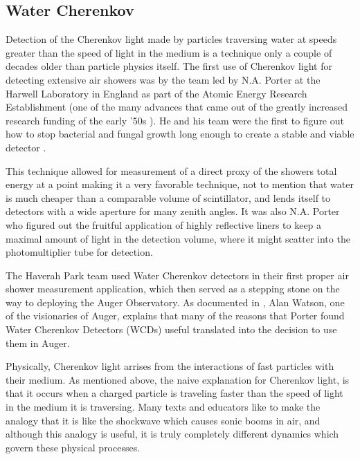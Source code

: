 \subsection{Water Cherenkov}
\label{wcd}
Detection of the Cherenkov light made by particles traversing water at speeds greater than the speed of light in the medium is a technique only a couple of decades older than particle physics itself. The first use of Cherenkov light for detecting extensive air showers was by the team led by N.A. Porter at the Harwell Laboratory in England as part of the Atomic Energy Research Establishment (one of the many advances that came out of the greatly increased research funding of the early '50s \cite{scifund1,firstcher}). He and his team were the first to figure out how to stop bacterial and fungal growth long enough to create a stable and viable detector \cite{firstcher}. 

This technique allowed for measurement of a direct proxy of the showers total energy at a point making it a very favorable technique, not to mention that water is much cheaper than a comparable volume of scintillator, and lends itself to detectors with a wide aperture for many zenith angles. It was also N.A. Porter who figured out the fruitful application of highly reflective liners to keep a maximal amount of light in the detection volume, where it might scatter into the photomultiplier tube for detection.

The Haverah Park team used Water Cherenkov detectors in their first proper air shower measurement application, which then served as a stepping stone on the way to deploying the Auger Observatory. As documented in \textcite{firstcher}, Alan Watson, one of the visionaries of Auger, explains that many of the reasons that Porter found Water Cherenkov Detectors (WCDs) useful translated into the decision to use them in Auger.

Physically, Cherenkov light arrises from the interactions of fast particles with their medium. As mentioned above, the naive explanation for Cherenkov light, is that it occurs when a charged particle is traveling faster than the speed of light in the medium it is traversing. Many texts and educators like to make the analogy that it is like the shockwave which causes sonic booms in air, and although this analogy is useful, it is truly completely different dynamics which govern these physical processes. 


